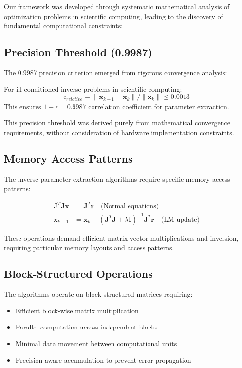 \documentclass[11pt,a4paper]{article}
\begin{document}
Our framework was developed through systematic mathematical analysis of optimization problems in scientific computing, leading to the discovery of fundamental computational constraints:

\subsection{Precision Threshold (0.9987)}
The 0.9987 precision criterion emerged from rigorous convergence analysis:

\begin{theorem}
For ill-conditioned inverse problems in scientific computing:
\[
\epsilon_{relative} = \|\mathbf{x}_{k+1} - \mathbf{x}_k\| / \|\mathbf{x}_k\| \leq 0.0013
\]
This ensures $1 - \epsilon = 0.9987$ correlation coefficient for parameter extraction.
\end{theorem}

This precision threshold was derived purely from mathematical convergence requirements, without consideration of hardware implementation constraints.

\subsection{Memory Access Patterns}
The inverse parameter extraction algorithms require specific memory access patterns:

\begin{align}
\mathbf{J}^T\mathbf{J}\mathbf{x} &= \mathbf{J}^T\mathbf{r} \quad \text{(Normal equations)} \\
\mathbf{x}_{k+1} &= \mathbf{x}_k - (\mathbf{J}^T\mathbf{J} + \lambda\mathbf{I})^{-1}\mathbf{J}^T\mathbf{r} \quad \text{(LM update)}
\end{align}

These operations demand efficient matrix-vector multiplications and inversion, requiring particular memory layouts and access patterns.

\subsection{Block-Structured Operations}
The algorithms operate on block-structured matrices requiring:

\begin{itemize}
\item Efficient block-wise matrix multiplication
\item Parallel computation across independent blocks
\item Minimal data movement between computational units
\item Precision-aware accumulation to prevent error propagation
\end{itemize}
\end{document}

